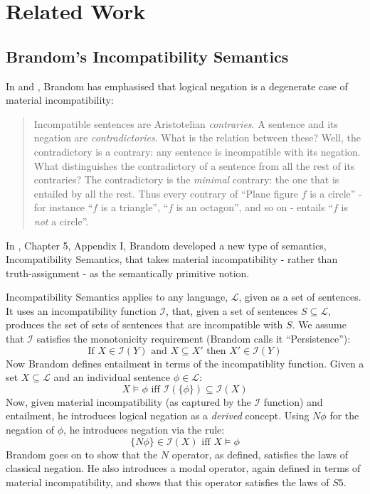 \section{Related Work}

\subsection{Brandom's Incompatibility Semantics}
In \cite{brandom} and \cite{brandom2}, Brandom has emphasised that logical negation is a degenerate case of material incompatibility:
\begin{quote}
Incompatible sentences are Aristotelian \emph{contraries}. A sentence and its negation are \emph{contradictories}. What is the relation between these? Well, the contradictory is a contrary: any sentence is incompatible with its negation. What distinguishes the contradictory of a sentence  from all the rest of its contraries? The contradictory is the \emph{minimal} contrary: the one that is entailed by all the rest. Thus every contrary of ``Plane figure $f$ is a circle'' - for instance ``$f$ is a triangle'', ``$f$ is an octagon'', and so on - entails ``$f$ is \emph{not} a circle''.
\end{quote}
In \cite{brandom}, Chapter 5, Appendix I, Brandom developed a new type of semantics, Incompatibility Semantics, that takes material incompatibility - rather than truth-assignment - as the semantically primitive notion.

Incompatibility Semantics applies to any language, $\mathcal{L}$, given as a set of sentences. 
It uses an incompatibility function $\mathcal{I}$, that, given a set of sentences $S \subseteq \mathcal{L}$, produces the set of sets of sentences that are incompatible with $S$.
We assume that $\mathcal{I}$ satisfies the monotonicity requirement (Brandom calls it ``Persistence''):
\[
\text{If } X \in \mathcal{I}(Y) \text{ and } X \subseteq X' \text{ then } X' \in \mathcal{I}(Y)
\]
Now Brandom defines entailment in terms of the incompatiblity function. Given a set $X \subseteq \mathcal{L}$ and an individual sentence $\phi \in \mathcal{L}$:
\[
X \models \phi \text{ iff } \mathcal{I}(\{\phi\}) \subseteq \mathcal{I}(X)
\]
Now, given material incompatibility (as captured by the $\mathcal{I}$ function) and entailment, he introduces logical negation as a \emph{derived} concept. Using $N \phi$ for the negation of $\phi$, he introduces negation via the rule:
\[
\{N \phi\} \in \mathcal{I}(X) \text{ iff } X \models \phi
\]
Brandom goes on to show that the $N$ operator, as defined, satisfies the laws of classical negation. 
He also introduces a modal operator, again defined in terms of material incompatibility, and shows that this operator satisfies the laws of $S5$.

